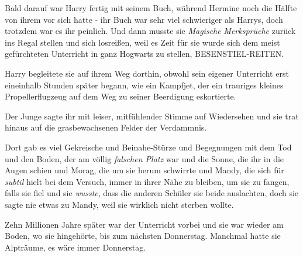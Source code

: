 Bald darauf war Harry fertig mit seinem Buch, während Hermine noch die Hälfte von ihrem vor sich hatte - ihr Buch war sehr viel schwieriger als Harrys, doch trotzdem war es ihr peinlich. Und dann musste sie \emph{Magische} \emph{Merksprüche} zurück ins Regal stellen und sich losreißen, weil es Zeit für sie wurde sich dem meist gefürchteten Unterricht in ganz Hogwarts zu stellen, BESENSTIEL-REITEN.

Harry begleitete sie auf ihrem Weg dorthin, obwohl sein eigener Unterricht erst eineinhalb Stunden später begann, wie ein Kampfjet, der ein trauriges kleines Propellerflugzeug auf dem Weg zu seiner Beerdigung eskortierte.

Der Junge sagte ihr mit leiser, mitfühlender Stimme auf Wiedersehen und sie trat hinaus auf die grasbewachsenen Felder der Verdammnis.

Dort gab es viel Gekreische und Beinahe-Stürze und Begegnungen mit dem Tod und den Boden, der am völlig \emph{falschen Platz} war und die Sonne, die ihr in die Augen schien und Morag, die um sie herum schwirrte und Mandy, die sich für \emph{subtil} hielt bei dem Versuch, immer in ihrer Nähe zu bleiben, um sie zu fangen, falls sie fiel und sie \emph{wusste}, dass die anderen Schüler sie beide auslachten, doch sie sagte nie etwas zu Mandy, weil sie wirklich nicht sterben wollte.

Zehn Millionen Jahre später war der Unterricht vorbei und sie war wieder am Boden, wo sie hingehörte, bis zum nächsten Donnerstag. Manchmal hatte sie Alpträume, es wäre immer Donnerstag.

